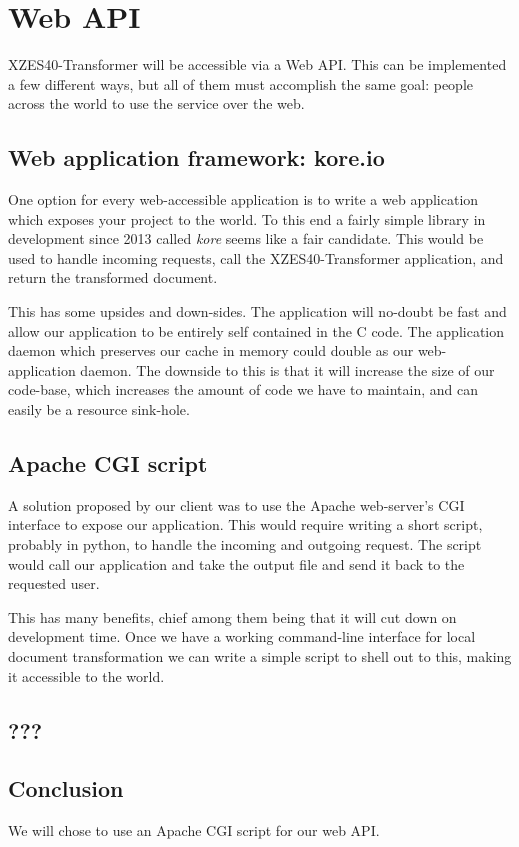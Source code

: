 \section{Web API}

XZES40-Transformer will be accessible via a Web API.
This can be implemented a few different ways, but all of them must accomplish the same goal: people across the world to use the service over the web.

\subsection{Web application framework: kore.io}

One option for every web-accessible application is to write a web application which exposes your project to the world.
To this end a fairly simple library in development since 2013 called \textit{kore} seems like a fair candidate.
This would be used to handle incoming requests, call the XZES40-Transformer application, and return the transformed document.

This has some upsides and down-sides.
The application will no-doubt be fast and allow our application to be entirely self contained in the C code.
The application daemon which preserves our cache in memory could double as our web-application daemon.
The downside to this is that it will increase the size of our code-base, which increases the amount of code we have to maintain, and can easily be a resource sink-hole.

\subsection{Apache CGI script}

A solution proposed by our client was to use the Apache web-server's CGI interface to expose our application.
This would require writing a short script, probably in python, to handle the incoming and outgoing request.
The script would call our application and take the output file and send it back to the requested user.
\cite{apache-cgi-tutorial}

This has many benefits, chief among them being that it will cut down on development time.
Once we have a working command-line interface for local document transformation we can write a simple script to shell out to this, making it accessible to the world.

\subsection{???}

\subsection{Conclusion}

We will chose to use an Apache CGI script for our web API.
